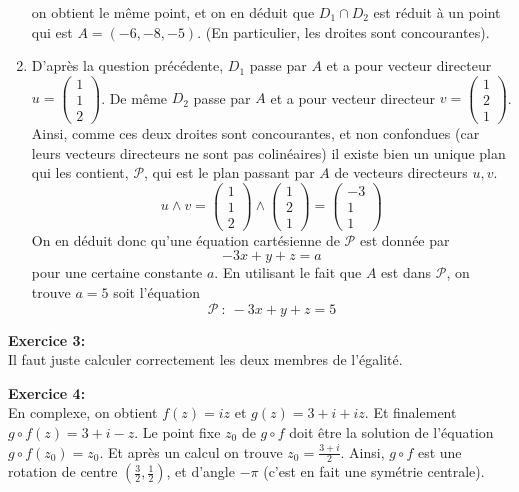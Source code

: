 \documentclass{article}
\begin{document}
\begin{enumerate}
on obtient le même point, et on en déduit que 
$D_1\cap D_2$ est réduit à un point qui est 
$A=(-6,-8,-5)$. (En particulier, les droites sont concourantes).
\item D'après la question précédente, $D_1$ passe par $A$ et a pour vecteur directeur 
$u=\begin{pmatrix}
1\\1\\2
\end{pmatrix}$. De même $D_2$ passe par $A$ et a pour vecteur directeur 
$v=\begin{pmatrix}
1\\2\\1
\end{pmatrix} $.
Ainsi, comme ces deux droites sont concourantes, et non confondues (car leurs vecteurs directeurs 
ne sont pas colinéaires) il existe bien un unique plan qui les contient, 
$\mathcal{P}$, qui est le plan passant par $A$ de vecteurs directeurs $u,v$. 
\[u \wedge v = 
\begin{pmatrix}
1\\1\\2
\end{pmatrix}
\wedge
\begin{pmatrix}
1\\2\\1
\end{pmatrix}
=
\begin{pmatrix}
-3\\1\\1
\end{pmatrix}\]
On en déduit donc qu'une équation cartésienne de 
$\mathcal{P}$ est donnée par 
\[-3x+y+z=a\] 
pour une certaine constante $a$. En utilisant le fait que $A$ est dans $\mathcal{P}$, 
on trouve $a=5$ soit l'équation 
\[ \mathcal{P} \ : \ -3x+y+z=5\]
\end{enumerate}




\medskip
\noindent
\textbf{Exercice 3:}\\ 
Il faut juste calculer correctement les deux membres de l'égalité.


\medskip
\noindent
\textbf{Exercice 4:}\\

En complexe, on obtient 
$f(z) = iz$ et  
$g(z) = 3+i+iz$. 
Et finalement $g\circ f(z) = 3+i-z$.
Le point fixe $z_0$ de $g\circ f $ doit être la solution de l'équation $g\circ f(z_0)=z_0$.
Et après un calcul on trouve  
$z_0= \frac{3+i}{2}$. Ainsi, 
$g\circ f$ est une rotation de centre $(\frac{3}{2}, \frac{1}{2})$, et d'angle $-\pi$ (c'est en fait une symétrie centrale). 
\end{document}
